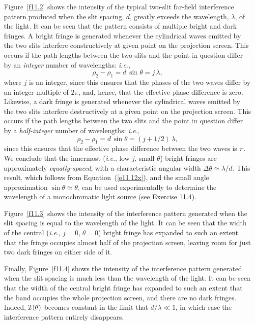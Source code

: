 Figure~\ref{f11.2} shows the intensity of the typical two-slit far-field interference pattern produced when the slit spacing, $d$, greatly exceeds the wavelength, $\lambda$,
of the light. 
It can be seen that the pattern consists of multiple bright and dark fringes. A bright fringe is generated whenever the cylindrical
waves emitted by the two slits interfere constructively at  given point on the projection screen. This occurs if the path lengths between the
 two slits and the  point in question differ by an {\em integer}\/ number of wavelengths: {\em i.e.}, 
 \begin{equation}\label{e11.12x}
 \rho_2-\rho_1 = d\,\sin\theta = j\,\lambda,
\end{equation}
where $j$ is an integer, since this ensures that the phases of the two waves differ by an integer multiple of  $2\pi$, and, hence, that
the effective phase difference is zero. 
 Likewise, a dark fringe is generated whenever the cylindrical waves emitted by the
two slits interfere destructively at a given point on the projection screen. This occurs if the path lengths between the two slits  and the point in question differ by a {\em half-integer}\/ number of wavelengths: {\em i.e.}, 
\begin{equation}
\rho_2-\rho_1=d\,\sin\theta= (j+1/2)\,\lambda,
\end{equation}
since this ensures that the effective phase difference between the two waves is $\pi$. 
We conclude  that the innermost ({\em i.e.}, low $j$, small $\theta$) bright fringes are approximately {\em equally-spaced}, with a characteristic
angular width $\Delta\theta\simeq \lambda/d$. This result, which follows
from Equation~(\ref{e11.12x}), and the small angle approximation $\sin\theta\simeq \theta$, can be used experimentally to determine the wavelength of a 
monochromatic light source (see Exercise 11.4).

Figure~\ref{f11.3} shows the intensity of the interference pattern generated when the slit spacing is equal to the wavelength of the light.
It can be seen that the width  of the central ({\em i.e.}, $j=0$, $\theta=0$) bright fringe has expanded to such
an extent that the fringe occupies almost half of the projection screen,  leaving room for just two dark fringes on either
side of it.

Finally, Figure~\ref{f11.4} shows the intensity of the interference pattern generated when the slit spacing is much less than the
wavelength of the light. It can be seen that the width of the central bright fringe  has expanded to
such an extent that the band occupies the whole projection screen, and there are no dark fringes. Indeed, ${\cal I}(\theta)$ becomes constant
in the limit that $d/\lambda\ll 1$,    in which case the interference pattern entirely disappears.


